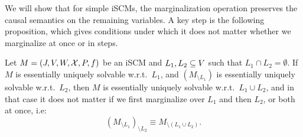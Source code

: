 We will show that for simple iSCMs, the marginalization operation preserves the causal semantics on the remaining variables. 
A key step is the following proposition, which gives conditions under which it does not matter whether we marginalize at once or in steps.
\begin{Prp}\label{prp:marginalization_commutes}
  Let $M = \left ( J, V, W, \mathcal{X}, P, f \right )$ be an iSCM and $L_1, L_2 \subseteq V$ such that $L_1 \cap L_2 = \emptyset$.
  If $M$ is essentially uniquely solvable w.r.t.\ $L_1$, and $(M_{\setminus L_1})$ is essentially uniquely solvable w.r.t.\ $L_2$, then $M$ is essentially uniquely solvable w.r.t.\ $L_1 \cup L_2$, and in that case it does not matter if we first marginalize over $L_1$ and then $L_2$, or both at once, i.e:
  $$(M_{\setminus L_1})_{\setminus L_2} \equiv M_{\setminus (L_1\cup L_2)}.$$
\end{Prp}
